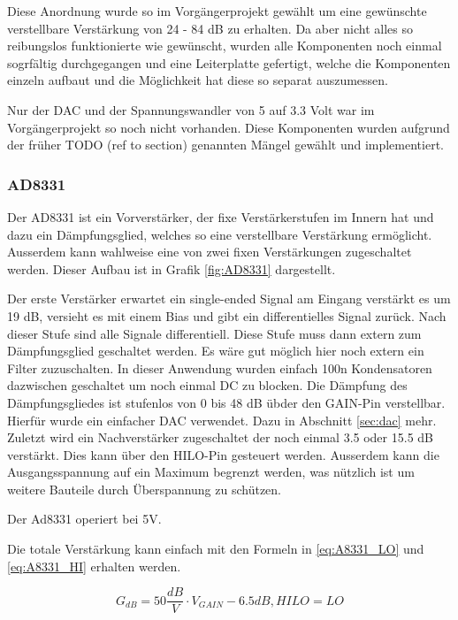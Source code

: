 Diese Anordnung wurde so im Vorgängerprojekt gewählt um eine gewünschte verstellbare Verstärkung von 24 - 84 dB zu erhalten.
Da aber nicht alles so reibungslos funktionierte wie gewünscht, wurden alle Komponenten noch einmal sogrfältig durchgegangen und eine Leiterplatte gefertigt, welche die Komponenten einzeln aufbaut und die Möglichkeit hat diese so separat auszumessen.

Nur der DAC und der Spannungswandler von 5 auf 3.3 Volt war im Vorgängerprojekt so noch nicht vorhanden. Diese Komponenten wurden aufgrund der früher TODO (ref to section) genannten Mängel gewählt und implementiert.

\subsubsection{AD8331}

Der AD8331 ist ein Vorverstärker, der fixe Verstärkerstufen im Innern hat und dazu ein Dämpfungsglied, welches so eine verstellbare Verstärkung ermöglicht. Ausserdem kann wahlweise eine von zwei fixen Verstärkungen zugeschaltet werden. Dieser Aufbau ist in Grafik \ref{fig:AD8331} dargestellt.

Der erste Verstärker erwartet ein single-ended Signal am Eingang verstärkt es um 19 dB, versieht es mit einem Bias und gibt ein differentielles Signal zurück. Nach dieser Stufe sind alle Signale differentiell.
Diese Stufe muss dann extern zum Dämpfungsglied geschaltet werden. Es wäre gut möglich hier noch extern ein Filter zuzuschalten. In dieser Anwendung wurden einfach 100n Kondensatoren dazwischen geschaltet um noch einmal DC zu blocken.
Die Dämpfung des Dämpfungsgliedes ist stufenlos von 0 bis 48 dB übder den GAIN-Pin verstellbar. Hierfür wurde ein einfacher DAC verwendet. Dazu in Abschnitt \ref{sec:dac} mehr.
Zuletzt wird ein Nachverstärker zugeschaltet der noch einmal 3.5 oder 15.5 dB verstärkt. Dies kann über den HILO-Pin gesteuert werden.
Ausserdem kann die Ausgangsspannung auf ein Maximum begrenzt werden, was nützlich ist um weitere Bauteile durch Überspannung zu schützen.

Der Ad8331 operiert bei 5V.

Die totale Verstärkung kann einfach mit den Formeln in \ref{eq:A8331_LO} und \ref{eq:A8331_HI} erhalten werden.

\begin{equation}
    G_{dB} = 50 \frac{dB}{V} \cdot V_{GAIN} - 6.5 dB, HILO = LO
\label{eq:A8331_LO}
\end{equation}


